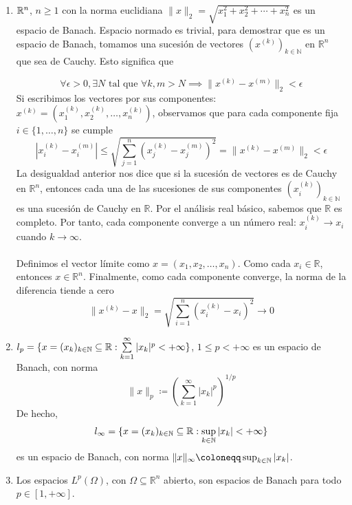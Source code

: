 \begin{ejemplo}
    \begin{enumerate}
        \item $\mathbb{R}^n$, $n\geq 1$ con la norma euclidiana $\|x\|_2 = \sqrt{x_1^2 + x_2^2 + \cdots + x_n^2}$ es un espacio de Banach. Espacio normado es trivial, para demostrar que es un espacio de Banach, tomamos una sucesión de vectores $(x^{(k)})_{k \in \mathbb{N}}$ en $\mathbb{R}^n$ que sea de Cauchy. Esto significa que
        
        $$\forall \epsilon > 0, \exists N \text{ tal que } \forall k, m > N \implies \|x^{(k)} - x^{(m)}\|_2 < \epsilon$$
        Si escribimos los vectores por sus componentes: $x^{(k)} = (x_1^{(k)}, x_2^{(k)}, \dots, x_n^{(k)})$, observamos que para cada componente fija $i \in \{1, \dots, n\}$ se cumple
        $$|x_i^{(k)} - x_i^{(m)}| \leq \sqrt{\sum_{j=1}^n (x_j^{(k)} - x_j^{(m)})^2} = \|x^{(k)} - x^{(m)}\|_2 < \epsilon$$
        La desigualdad anterior nos dice que si la sucesión de vectores es de Cauchy en $\mathbb{R}^n$, entonces cada una de las sucesiones de sus componentes $(x_i^{(k)})_{k \in \mathbb{N}}$ es una sucesión de Cauchy en $\mathbb{R}$. Por el análisis real básico, sabemos que $\mathbb{R}$ es completo. Por tanto, cada componente converge a un número real: $x_i^{(k)} \to x_i$ cuando $k \to \infty$.\\ \\
        \noindent
        Definimos el vector límite como $x = (x_1, x_2, \dots, x_n)$. Como cada $x_i \in \mathbb{R}$, entonces $x \in \mathbb{R}^n$. Finalmente, como cada componente converge, la norma de la diferencia tiende a cero
        $$\|x^{(k)} - x\|_2 = \sqrt{\sum_{i=1}^n (x_i^{(k)} - x_i)^2} \longrightarrow 0$$

        \item $l_p=\{x=(x_k)_{k\in\mathbb{N}}\subseteq \mathbb{R} : \sum\limits_{k=1}^\infty |x_k|^p < +\infty\}$, $1 \leq p < +\infty$ es un espacio de Banach, con norma
        \begin{equation*}
            \|x\|_p \coloneqq \left( \sum_{k=1}^\infty |x_k|^p \right)^{1/p}
        \end{equation*}
        De hecho, 
        \begin{equation*}
            l_{\infty} = \{x=(x_k)_{k\in\mathbb{N}}\subseteq \mathbb{R} : \sup_{k\in\mathbb{N}} |x_k| < +\infty\}
        \end{equation*}
        es un espacio de Banach, con norma $\|x\|_\infty \coloneqq \sup_{k\in\N} |x_k|$.
        \item Los espacios $L^p(\Omega)$, con $\Omega \subseteq \mathbb{R}^n$ abierto, son espacios de Banach para todo $p \in [1, +\infty]$. \\
        \end{enumerate}
\end{ejemplo}

